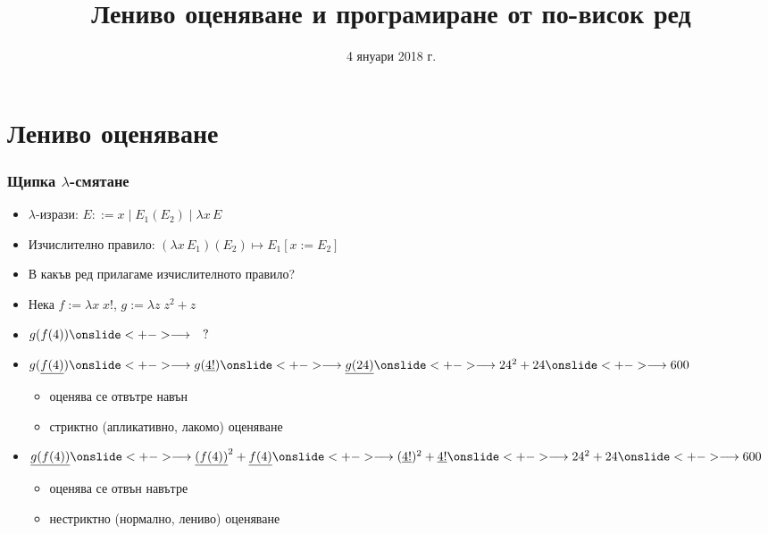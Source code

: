\documentclass{beamer}
\title[Лениво оценяване]{Лениво оценяване и програмиране от по-висок ред}
\date{4 януари 2018 г.}
\newcommand{\lra}{\onslide<+->$\longrightarrow$\xspace}
\begin{document}
\begin{frame}
  \titlepage
\end{frame}

\section{Лениво оценяване}

\begin{frame}
  \frametitle{Щипка $\lambda$-смятане}

  \renewcommand{\lra}{\onslide<+->\longrightarrow\xspace}
  \begin{itemize}[<+->]
  \item $\lambda$-изрази: $E ::= x \;|\; E_1(E_2) \;|\; \lambda x\, E$
  \item Изчислително правило: $(\lambda x\,E_1)(E_2) \mapsto E_1[x := E_2]$
  \item В какъв ред прилагаме изчислителното правило?
  \item Нека $f := \lambda x\; x!$, $g := \lambda z\;z^2+z$
  \item $g(f(4)) \lra \quad ?$
  \item $g(\underline{f(4)})
    \lra g(\underline{4!})
    \lra \underline{g(24)}
    \lra 24^2 + 24
    \lra 600$
    \begin{itemize}
    \item<16-> оценява се \alert{отвътре навън}
    \item<17-> \alert{стриктно} (апликативно, лакомо) оценяване
    \end{itemize}
  \item $\underline{g(f(4))}
    \lra \underline{(f(4))}^2 + \underline{f(4)}
    \lra (\underline{4!})^2 + \underline{4!}
    \lra 24^2 + 24
    \lra 600$
    \begin{itemize}
    \item<16-> оценява се \alert{отвън навътре}
    \item<17-> \alert{нестриктно} (нормално, лениво) оценяване
    \end{itemize}
  \end{itemize}
\end{frame}
\end{document}
